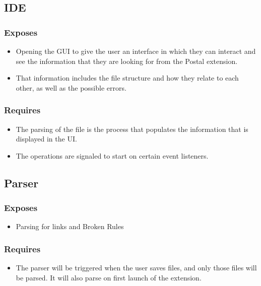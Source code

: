 \documentclass[letterpaper,10pt,titlepage,draftclsnofoot,onecolumn,onesided] {IEEEtran}
\begin{document}
\subsection{IDE}
	
\subsubsection{Exposes}
\begin{itemize}
	\item Opening the GUI to give the user an interface in which they can interact and see the information that they are looking for from the Postal extension.
	\item That information includes the file structure and how they relate to each other, as well as the possible errors. 
\end{itemize}
		
\subsubsection{Requires}
\begin{itemize}
	\item The parsing of the file is the process that populates the information that is displayed in the UI.
	\item The operations are signaled to start on certain event listeners.
\end{itemize}
			
\subsection{Parser}

\subsubsection{Exposes}
\begin{itemize}
	\item Parsing for links and Broken Rules
\end{itemize}
		
\subsubsection{Requires}
\begin{itemize}
	\item The parser will be triggered when the user saves files, and only those files will be parsed. 
It will also parse on first launch of the extension.
\end{itemize}
	
\end{document}
